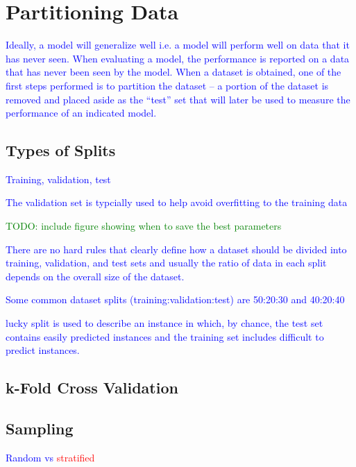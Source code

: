 \section{Partitioning Data}

\textcolor{blue}{Ideally, a model will generalize well i.e. a model will perform well on data that it has never seen. When evaluating a model, the performance is reported on a data that has never been seen by the model. When a dataset is obtained, one of the first steps performed is to partition the dataset -- a portion of the dataset is removed and placed aside as the ``test'' set that will later be used to measure the performance of an indicated model.}

\subsection{Types of Splits}

\textcolor{blue}{Training, validation, test}

\textcolor{blue}{The validation set is typcially used to help avoid overfitting to the training data}

\textcolor{green}{TODO: include figure showing when to save the best parameters}

\textcolor{blue}{There are no hard rules that clearly define how a dataset should be divided into training, validation, and test sets and usually the ratio of data in each split depends on the overall size of the dataset.}

\textcolor{blue}{Some common dataset splits (training:validation:test) are 50:20:30 and 40:20:40}

\textcolor{blue}{{lucky split} is used to describe an instance in which, by chance, the test set contains easily predicted instances and the training set includes difficult to predict instances.}

\subsection{k-Fold Cross Validation}



\subsection{Sampling}

\textcolor{blue}{Random vs \textcolor{red}{stratified}}
